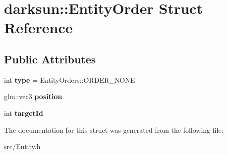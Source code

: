 \hypertarget{structdarksun_1_1_entity_order}{}\section{darksun\+::Entity\+Order Struct Reference}
\label{structdarksun_1_1_entity_order}
\subsection*{Public Attributes}
\begin{DoxyCompactItemize}
\item 
\mbox{\label{structdarksun_1_1_entity_order_a3d5e42ef6a391311c56e5214c0640fbd}} 
int {\bfseries type} = Entity\+Orders\+::\+O\+R\+D\+E\+R\+\_\+\+N\+O\+NE
\item 
\mbox{\label{structdarksun_1_1_entity_order_a1cb41c8ee74f7ed11d26fabccd1778e1}} 
glm\+::vec3 {\bfseries position}
\item 
\mbox{\label{structdarksun_1_1_entity_order_afa8d725402dd89e8358c47a1be38a66f}} 
int {\bfseries target\+Id}
\end{DoxyCompactItemize}


The documentation for this struct was generated from the following file\+:\begin{DoxyCompactItemize}
\item 
src/Entity.\+h\end{DoxyCompactItemize}
